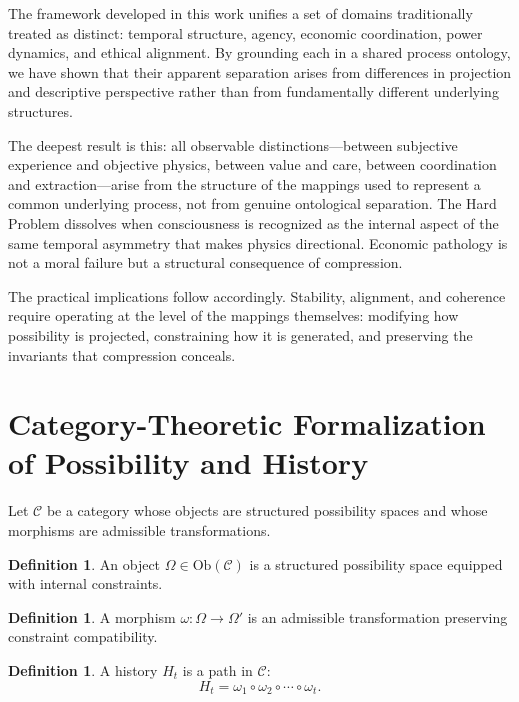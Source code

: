 \documentclass[11pt,a4paper]{article}
\theoremstyle{definition}
\newtheorem{definition}[theorem]{Definition}
\theoremstyle{remark}
\begin{document}
The framework developed in this work unifies a set of domains traditionally treated as distinct: temporal structure, agency, economic coordination, power dynamics, and ethical alignment. By grounding each in a shared process ontology, we have shown that their apparent separation arises from differences in projection and descriptive perspective rather than from fundamentally different underlying structures.

The deepest result is this: all observable distinctions---between subjective experience and objective physics, between value and care, between coordination and extraction---arise from the structure of the mappings used to represent a common underlying process, not from genuine ontological separation. The Hard Problem dissolves when consciousness is recognized as the internal aspect of the same temporal asymmetry that makes physics directional. Economic pathology is not a moral failure but a structural consequence of compression.

The practical implications follow accordingly. Stability, alignment, and coherence require operating at the level of the mappings themselves: modifying how possibility is projected, constraining how it is generated, and preserving the invariants that compression conceals.

\appendix

\section{Category-Theoretic Formalization of Possibility and History}

Let $\mathcal{C}$ be a category whose objects are structured possibility spaces and whose morphisms are admissible transformations.

\begin{definition}
An object $\Omega \in \mathrm{Ob}(\mathcal{C})$ is a structured possibility space equipped with internal constraints.
\end{definition}

\begin{definition}
A morphism $\omega : \Omega \to \Omega'$ is an admissible transformation preserving constraint compatibility.
\end{definition}

\begin{definition}
A history $H_t$ is a path in $\mathcal{C}$:
\[
H_t = \omega_1 \circ \omega_2 \circ \cdots \circ \omega_t.
\]
\end{definition}
\end{document}
